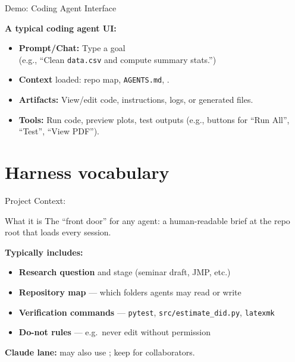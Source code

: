 \begin{frame}[fragile]{Demo: Coding Agent Interface}

  
      \textbf{A typical coding agent UI:}
      \begin{itemize}
        \item \textbf{Prompt/Chat:} Type a goal\\ (e.g., ``Clean \texttt{data.csv} and compute summary stats.'')
        \item \textbf{Context} loaded: repo map, \texttt{AGENTS.md}, .
        \item \textbf{Artifacts:} View/edit code, instructions, logs, or generated files.
        \item \textbf{Tools:} Run code, preview plots, test outputs {\scriptsize(e.g., buttons for ``Run All'', ``Test'', ``View PDF'').}
      \end{itemize}
      
  
  
\end{frame}

\section{Harness vocabulary}

\begin{frame}{Project Context: }
  \begin{block}{What it is}
    The ``front door'' for any agent: a human-readable brief at the repo root that loads every session.
  \end{block}
  \textbf{Typically includes:}
  \begin{itemize}
    \item \textbf{Research question} \textnormal{and stage (seminar draft, JMP, etc.)}
    \item \textbf{Repository map} \textnormal{--- which folders agents may read or write}
    \item \textbf{Verification commands} \textnormal{--- \texttt{pytest}, \texttt{src/estimate\_did.py}, \texttt{latexmk}}
    \item \textbf{Do-not rules} \textnormal{--- e.g.\ never edit  without permission}
  \end{itemize}
  \vspace{0.25em}
  \textbf{Claude lane:} \textnormal{may also use ; keep  for collaborators.}
\end{frame}

